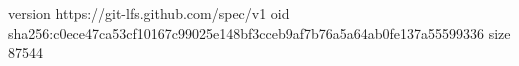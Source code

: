version https://git-lfs.github.com/spec/v1
oid sha256:c0ece47ca53cf10167c99025e148bf3cceb9af7b76a5a64ab0fe137a55599336
size 87544
